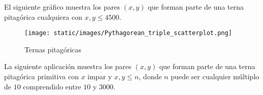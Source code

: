 El siguiente gráfico muestra los pares \((x,y)\) que forman parte de una
terna pitagórica cualquiera con \(x,y\leq 4500\).

\begin{figure}
\centering
\texttt{[image: static/images/Pythagorean\_triple\_scatterplot.png]}
\caption{Ternas pitagóricas}
\end{figure}

La siguiente aplicación muestra los pares \((x,y)\) que forman parte de
una terna pitagórica primitiva con \(x\) impar y \(x,y\leq n\), donde
\(n\) puede ser cualquier múltiplo de \(10\) comprendido entre \(10\) y
\(3000\).
